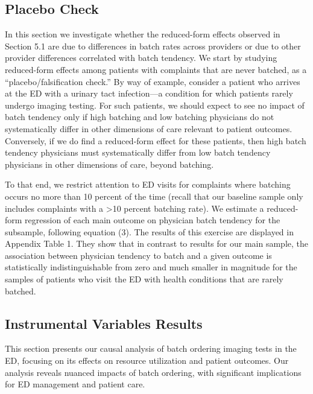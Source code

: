 \documentclass{article}
\begin{document}
\hypertarget{placebo-check}{%
\subsection{Placebo Check}\label{placebo-check}}

In this section we investigate whether the reduced-form effects observed
in Section 5.1 are due to differences in batch rates across providers or
due to other provider differences correlated with batch tendency. We
start by studying reduced-form effects among patients with complaints
that are never batched, as a ``placebo/falsification check.'' By way of
example, consider a patient who arrives at the ED with a urinary tact
infection---a condition for which patients rarely undergo imaging
testing. For such patients, we should expect to see no impact of batch
tendency only if high batching and low batching physicians do not
systematically differ in other dimensions of care relevant to patient
outcomes. Conversely, if we do find a reduced-form effect for these
patients, then high batch tendency physicians must systematically differ
from low batch tendency physicians in other dimensions of care, beyond
batching.

To that end, we restrict attention to ED visits for complaints where
batching occurs no more than 10 percent of the time (recall that our
baseline sample only includes complaints with a \textgreater10 percent
batching rate). We estimate a reduced-form regression of each main
outcome on physician batch tendency for the subsample, following
equation (3). The results of this exercise are displayed in Appendix
Table 1. They show that in contrast to results for our main sample, the
association between physician tendency to batch and a given outcome is
statistically indistinguishable from zero and much smaller in magnitude
for the samples of patients who visit the ED with health conditions that
are rarely batched.

\hypertarget{instrumental-variables-results}{%
\subsection{Instrumental Variables
Results}\label{instrumental-variables-results}}

This section presents our causal analysis of batch ordering imaging
tests in the ED, focusing on its effects on resource utilization and
patient outcomes. Our analysis reveals nuanced impacts of batch
ordering, with significant implications for ED management and patient
care.
\end{document}
